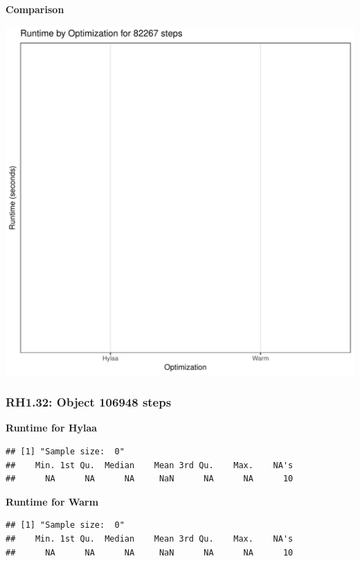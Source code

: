 \documentclass{article}\usepackage[]{graphicx}\usepackage[]{color}
\makeatletter
\def\maxwidth{ %
  \ifdim\Gin@nat@width>\linewidth
    \linewidth
  \else
    \Gin@nat@width
  \fi
}
\newenvironment{kframe}{%
 \def\at@end@of@kframe{}%
 \ifinner\ifhmode%
  \def\at@end@of@kframe{\end{minipage}}%
  \begin{minipage}{\columnwidth}%
 \fi\fi%
 \def\FrameCommand##1{\hskip\@totalleftmargin \hskip-\fboxsep
 \colorbox{shadecolor}{##1}\hskip-\fboxsep
     \hskip-\linewidth \hskip-\@totalleftmargin \hskip\columnwidth}%
 \MakeFramed {\advance\hsize-\width
   \@totalleftmargin\z@ \linewidth\hsize
   \@setminipage}}%
 {\par\unskip\endMakeFramed%
 \at@end@of@kframe}
\newenvironment{knitrout}{}{} %
\makeatother
\begin{document}
 \textbf{Comparison}
  
\begin{knitrout}
\color{fgcolor}
\includegraphics[width=\maxwidth]{figure/RH1_steps82267-1} 

\end{knitrout}


\subsubsection{RH1.32: Object 106948 steps}

 \textbf{Runtime for Hylaa}
\begin{knitrout}
\color{fgcolor}\begin{kframe}
\begin{verbatim}
## [1] "Sample size:  0"
##    Min. 1st Qu.  Median    Mean 3rd Qu.    Max.    NA's 
##      NA      NA      NA     NaN      NA      NA      10
\end{verbatim}
\end{kframe}
\end{knitrout}
 \textbf{Runtime for Warm}
\begin{knitrout}
\color{fgcolor}\begin{kframe}
\begin{verbatim}
## [1] "Sample size:  0"
##    Min. 1st Qu.  Median    Mean 3rd Qu.    Max.    NA's 
##      NA      NA      NA     NaN      NA      NA      10
\end{verbatim}
\end{kframe}
\end{knitrout}
  
\end{document}
